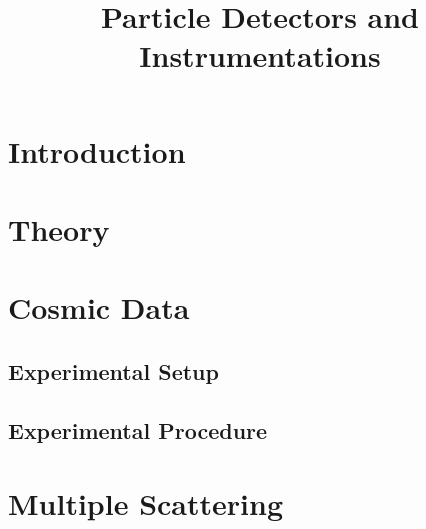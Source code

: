 \documentclass[sn-mathphys-num,iicol]{sn-jnl}
\theoremstyle{thmstyleone}
\theoremstyle{thmstyletwo}
\theoremstyle{thmstylethree}
\begin{document}
        
\title[]{Particle Detectors and Instrumentations}
\author*[1]{ }
\author*[1]{ }

\maketitle

\section{Introduction}

\section{Theory}

\section{Cosmic Data}
\subsection{Experimental Setup}
\subsection{Experimental Procedure}



\section{Multiple Scattering}
\end{document}
